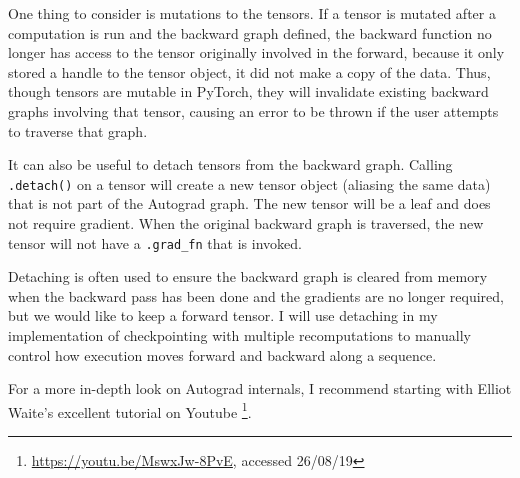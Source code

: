 One thing to consider is mutations to the tensors.
If a tensor is mutated after a computation is run and the backward graph defined, the backward function no longer has access to the tensor originally involved in the forward, because it only stored a handle to the tensor object, it did not make a copy of the data. 
Thus, though tensors are mutable in PyTorch, they will invalidate existing backward graphs involving that tensor, causing an error to be thrown if the user attempts to traverse that graph.

It can also be useful to detach tensors from the backward graph. Calling \texttt{.detach()} on a tensor will create a new tensor object (aliasing the same data) that is not part of the Autograd graph.
The new tensor will be a leaf and does not require gradient.
When the original backward graph is traversed, the new tensor will not have a \texttt{.grad\_fn} that is invoked.

Detaching is often used to ensure the backward graph is cleared from memory when the backward pass has been done and the gradients are no longer required, but we would like to keep a forward tensor.
I will use detaching in my implementation of checkpointing with multiple recomputations to manually control how execution moves forward and backward along a sequence.

For a more in-depth look on Autograd internals, I recommend starting with Elliot Waite's excellent tutorial on Youtube \footnote{\url{https://youtu.be/MswxJw-8PvE}, accessed 26/08/19}.


